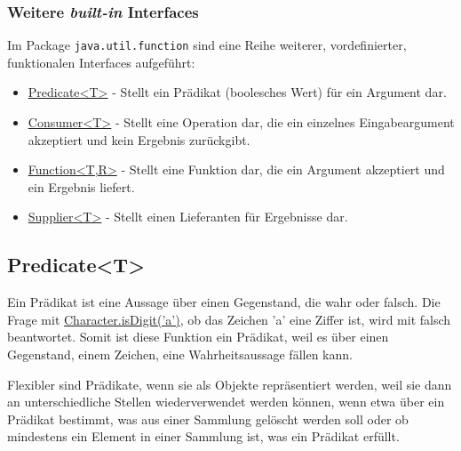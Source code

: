 \begin{frame}[fragile]
    \frametitle<presentation>{Weitere \emph{built-in} Interfaces}
    Im Package \texttt{java.util.function} sind eine Reihe weiterer, vordefinierter,
    funktionalen Interfaces aufgeführt:

    \begin{itemize}
        \item \href{https://docs.oracle.com/en/java/javase/11/docs/api/java.base/java/util/function/Predicate.html}{Predicate<T>} -
        Stellt ein Prädikat (boolesches Wert) für ein Argument dar.
        \item \href{https://docs.oracle.com/en/java/javase/11/docs/api/java.base/java/util/function/Consumer.html}{Consumer<T>} -
        Stellt eine Operation dar, die ein einzelnes Eingabeargument akzeptiert und kein Ergebnis zurückgibt.
        \item \href{https://docs.oracle.com/en/java/javase/11/docs/api/java.base/java/util/function/Function.html}{Function<T,R>} -
        Stellt eine Funktion dar, die ein Argument akzeptiert und ein Ergebnis liefert.
        \item \href{https://docs.oracle.com/en/java/javase/11/docs/api/java.base/java/util/function/Supplier.html}{Supplier<T>} -
        Stellt einen Lieferanten für Ergebnisse dar.
    \end{itemize}
\end{frame}


\subsection{Predicate<T>}
\label{subsec:predicate}

Ein Prädikat ist eine Aussage über einen Gegenstand, die wahr oder falsch.
Die Frage mit
\href{https://docs.oracle.com/en/java/javase/11/docs/api/java.base/java/lang/Character.html#isDigit(char)}
{Character.isDigit('a')}, ob das Zeichen 'a' eine Ziffer ist,
wird mit falsch beantwortet. Somit ist diese Funktion ein Prädikat, weil es über einen
Gegenstand, einem Zeichen, eine Wahrheitsaussage fällen kann.

Flexibler sind Prädikate, wenn sie als Objekte repräsentiert werden, weil sie
dann an unterschiedliche Stellen wiederverwendet werden können, wenn etwa über
ein Prädikat bestimmt, was aus einer Sammlung gelöscht werden soll oder ob
mindestens ein Element in einer Sammlung ist, was ein Prädikat erfüllt.

